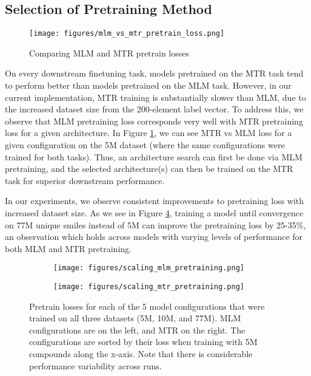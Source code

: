 \documentclass{article}
\begin{document}
\subsection{Selection of Pretraining Method}
\begin{figure}[h]\caption{Comparing MLM and MTR pretrain losses}
\centering
\texttt{[image: figures/mlm\_vs\_mtr\_pretrain\_loss.png]}
\label{fig:mlm vs mtr pretrain loss}
\end{figure}

On every downstream finetuning task, models pretrained on the MTR task tend to perform better than models pretrained on the MLM task. However, in our current implementation, MTR training is substantially slower than MLM, due to the increased dataset size from the 200-element label vector. To address this, we observe that MLM pretraining loss corresponds very well with MTR pretraining loss for a given architecture. In Figure \ref{fig:mlm vs mtr pretrain loss}, we can see MTR vs MLM loss for a given configuration on the 5M dataset (where the same configurations were trained for both tasks). Thus, an architecture search can first be done via MLM pretraining, and the selected architecture(s) can then be trained on the MTR task for superior downstream performance.

In our experiments, we observe consistent improvements to pretraining loss with increased dataset size. As we see in Figure \ref{fig:scaling mlm and mtr}, training a model until convergence on 77M unique smiles instead of 5M can improve the pretraining loss by 25-35\%, an observation which holds across models with varying levels of performance for both MLM and MTR pretraining. 

\begin{figure}
     \centering
     \begin{subfigure}[b]{0.4\textwidth}
         \centering
         \texttt{[image: figures/scaling\_mlm\_pretraining.png]}
         \label{fig:scaling mlm}
     \end{subfigure}
     \begin{subfigure}[b]{0.4\textwidth}
         \centering
         \texttt{[image: figures/scaling\_mtr\_pretraining.png]}
         \label{fig:scaling mtr}
     \end{subfigure}
        \caption{Pretrain losses for each of the 5 model configurations that were trained on all three datasets (5M, 10M, and 77M). MLM configurations are on the left, and MTR on the right. The configurations are sorted by their loss when training with 5M compounds along the x-axis. Note that there is considerable performance variability across runs.}
        \label{fig:scaling mlm and mtr}
\end{figure}
\end{document}
